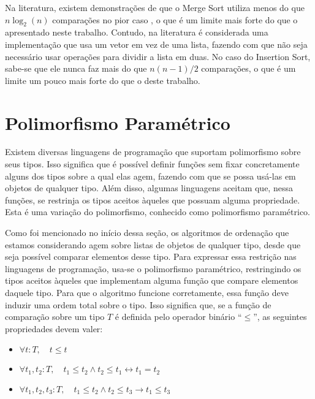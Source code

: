 \documentclass[12pt, oneside, a4paper,english,brazil]{abntex2}
\begin{document}
\qquad Na literatura, existem demonstra\c{c}\~oes de que o Merge Sort utiliza menos do que $n\log_{2}(n)$
compara\c{c}\~oes no pior caso \cite{1}, o que \'e um limite mais forte do que o apresentado neste trabalho.
Contudo, na literatura \'e considerada uma implementa\c{c}\~ao que usa um vetor em vez de uma lista,
fazendo com que n\~ao seja necess\'ario usar opera\c{c}\~oes para dividir a lista em duas. No caso do Insertion
Sort, sabe-se que ele nunca faz mais do
que $n(n - 1) / 2$ compara\c{c}\~oes, o que \'e um limite um pouco mais forte
do que o deste trabalho.

\section{Polimorfismo Param\'etrico}

\qquad Existem diversas linguagens de programa\c{c}\~ao que suportam polimorfismo sobre seus tipos. Isso
significa que \'e poss\'ivel definir fun\c{c}\~oes sem fixar concretamente alguns dos tipos sobre a qual elas
agem, fazendo com que se possa us\'a-las em objetos de qualquer tipo. Al\'em disso, algumas linguagens
aceitam que, nessa fun\c{c}\~oes, se restrinja os tipos aceitos \`aqueles que possuam alguma propriedade.
Esta \'e uma varia\c{c}\~ao do polimorfismo, conhecido como polimorfismo param\'etrico.

\qquad Como foi mencionado no in\'icio dessa se\c{c}\~ao, os algoritmos de ordena\c{c}\~ao que estamos
considerando agem sobre listas de objetos de qualquer tipo, desde que seja poss\'ivel comparar elementos
desse tipo. Para expressar essa restri\c{c}\~ao nas linguagens de programa\c{c}\~ao, usa-se o polimorfismo
param\'etrico, restringindo os tipos aceitos \`aqueles que implementam alguma fun\c{c}\~ao que compare
elementos daquele tipo. Para que o algoritmo funcione corretamente, essa fun\c{c}\~ao deve induzir uma ordem
total sobre o tipo. Isso significa que, se a fun\c{c}\~ao de compara\c{c}\~ao sobre um tipo $T$ \'e definida
pelo operador bin\'ario ``$\le$'', as seguintes propriedades devem valer:

\begin{itemize}
  \item $\forall t : T, \quad t \le t$
  \item $\forall t_{1}, t_{2} : T, \quad t_{1} \le t_{2} \wedge t_{2} \le t_{1} \leftrightarrow t_{1} = t_{2}$
  \item $\forall t_{1}, t_{2}, t_{3} : T, \quad t_{1} \le t_{2} \wedge t_{2} \le t_{3} \rightarrow t_{1} \le t_{3}$
\end{itemize}
\end{document}
